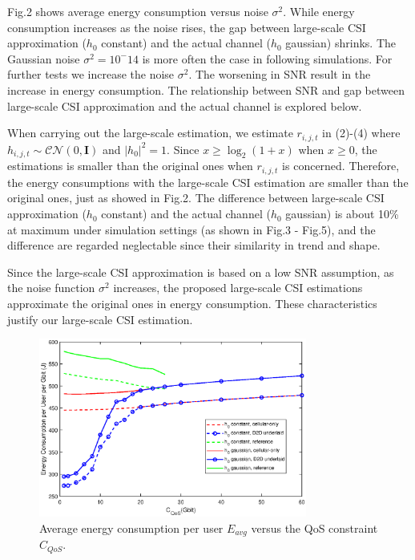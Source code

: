 \documentclass{ieeeaccess}
\begin{document}

Fig.2 shows average energy consumption versus noise ${\sigma ^2}$. While energy consumption increases as the noise rises, the gap between large-scale CSI approximation (${h_0}$ constant) and the actual channel (${h_0}$ gaussian) shrinks. The Gaussian noise ${\sigma ^2 = 10^-14}$ is more often the case in following simulations. For further tests we increase the noise ${\sigma ^2}$. The worsening in SNR result in the increase in energy consumption. The relationship between SNR and  gap between large-scale CSI approximation and the actual channel is explored below. 

When carrying out the large-scale estimation, we estimate ${r_{i,j,t}}$ in (2)-(4) where  ${h_{i,j,t}} \sim \mathcal{CN}(0, \mathbf{I})$ and ${\left| {{h_0}} \right|^2} = 1$. Since $x \ge {\log _2}\left( {1 + x} \right)$ when ${x \ge 0}$, the estimations is smaller than the original ones when ${r_{i,j,t}}$ is concerned. Therefore, the energy consumptions with the large-scale CSI estimation are smaller than the original ones, just as showed in Fig.2. The difference between large-scale CSI approximation (${h_0}$ constant) and the actual channel (${h_0}$ gaussian) is about 10\% at maximum under simulation settings (as shown in Fig.3 - Fig.5), and the difference are regarded neglectable since their similarity in trend and shape. 

Since the large-scale CSI approximation is based on a low SNR assumption, as the noise function ${\sigma ^2}$ increases, the proposed large-scale CSI estimations approximate the original ones in energy consumption. These characteristics justify our large-scale CSI estimation.


\begin{figure} [htb]
\includegraphics*[width=8.8cm]{Cqos.eps}
\caption{Average energy consumption per user $E_{avg}$ versus the QoS constraint ${C_{QoS}}$.}\label{fig:3}
\end{figure}
\end{document}
